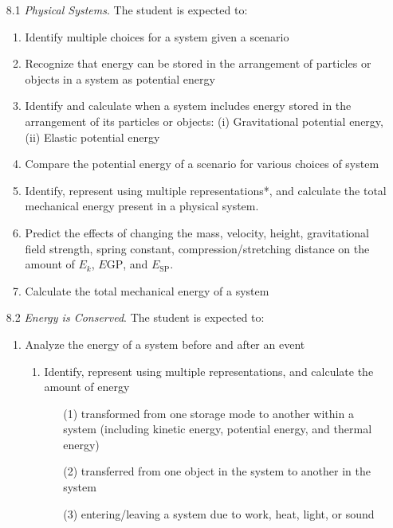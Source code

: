 \documentclass[dvipsnames]{article}
\begin{document}
\begin{enumerate}
    \item[8.1] \textit{Physical Systems}. The student is expected to:
    \begin{enumerate}
        \item Identify multiple choices for a system given a scenario 
        \item Recognize that energy can be stored in the arrangement of particles or objects in a system as potential energy
        \item Identify and calculate when a system includes energy stored in the arrangement of its particles or objects: (i) Gravitational potential energy, (ii) Elastic potential energy
        \item Compare the potential energy of a scenario for various choices of system
        \item Identify, represent using multiple representations*, and calculate the total mechanical energy present in a physical system.
        \item Predict the effects of changing the mass, velocity,  height, gravitational field strength, spring constant, compression/stretching distance on the amount of $E_k$, $E\mathrm{GP}$, and $E_\mathrm{SP}$.
        \item Calculate the total mechanical energy of a system
    \end{enumerate}
    \item[8.2] \textit{Energy is Conserved}. The student is expected to:
    \begin{enumerate}
        \item Analyze the energy of a system before and after an event 
        \begin{enumerate}
            \item Identify, represent using multiple representations, and calculate the amount of energy
            \begin{itemize}
                \item[] (1) transformed from one storage mode to another within a system (including kinetic energy, potential energy, and thermal energy)
                \item[] (2) transferred from one object in the system to another in the system
                \item[] (3) entering/leaving a system due to work, heat, light, or sound
            \end{itemize}
        \end{enumerate}

\end{enumerate}
\end{enumerate}
\end{document}
